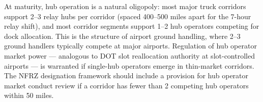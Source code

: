 At maturity, hub operation is a natural oligopoly: most major truck corridors support 2--3 relay hubs per corridor (spaced 400--500 miles apart for the 7-hour relay shift), and most corridor segments support 1--2 hub operators competing for dock allocation. This is the structure of airport ground handling, where 2--3 ground handlers typically compete at major airports. Regulation of hub operator market power --- analogous to DOT slot reallocation authority at slot-controlled airports --- is warranted if single-hub operators emerge in thin-market corridors. The NFRZ designation framework should include a provision for hub operator market conduct review if a corridor has fewer than 2 competing hub operators within 50 miles.
